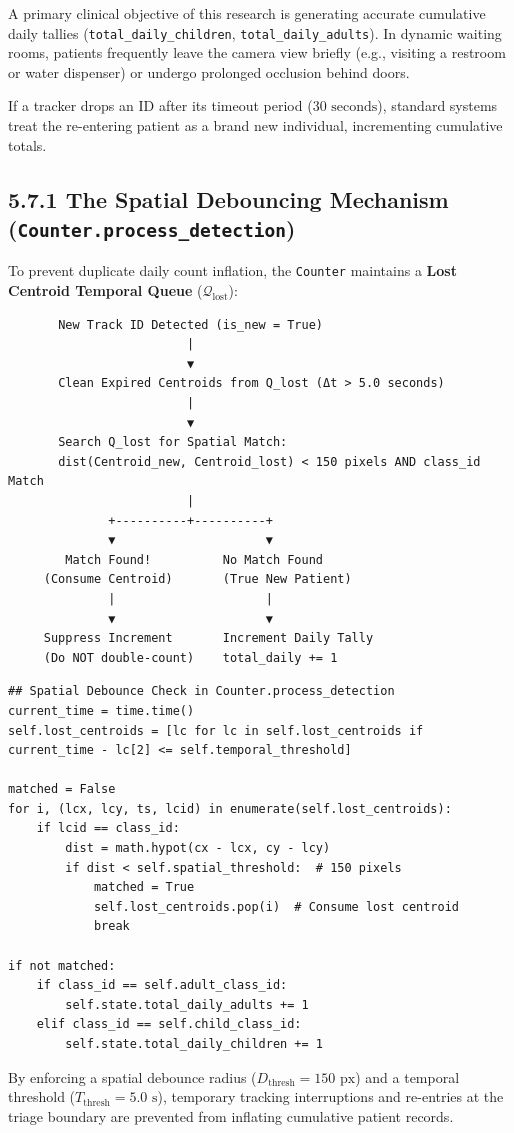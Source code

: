 A primary clinical objective of this research is generating accurate
cumulative daily tallies (\texttt{total\_daily\_children},
\texttt{total\_daily\_adults}). In dynamic waiting rooms, patients
frequently leave the camera view briefly (e.g., visiting a restroom or
water dispenser) or undergo prolonged occlusion behind doors.

If a tracker drops an ID after its timeout period
(\(30\text{ seconds}\)), standard systems treat the re-entering patient
as a brand new individual, incrementing cumulative totals.

\subsection{\texorpdfstring{5.7.1 The Spatial Debouncing Mechanism
(\texttt{Counter.process\_detection})}{5.7.1 The Spatial Debouncing Mechanism (Counter.process\_detection)}}\label{the-spatial-debouncing-mechanism-counter.process_detection}

To prevent duplicate daily count inflation, the \texttt{Counter}
maintains a \textbf{Lost Centroid Temporal Queue}
(\(\mathcal{Q}_{\text{lost}}\)):

\begin{verbatim}
       New Track ID Detected (is_new = True)
                         |
                         ▼
       Clean Expired Centroids from Q_lost (Δt > 5.0 seconds)
                         |
                         ▼
       Search Q_lost for Spatial Match:
       dist(Centroid_new, Centroid_lost) < 150 pixels AND class_id Match
                         |
              +----------+----------+
              ▼                     ▼
        Match Found!          No Match Found
     (Consume Centroid)       (True New Patient)
              |                     |
              ▼                     ▼
     Suppress Increment       Increment Daily Tally
     (Do NOT double-count)    total_daily += 1
\end{verbatim}

\begin{verbatim}
## Spatial Debounce Check in Counter.process_detection
current_time = time.time()
self.lost_centroids = [lc for lc in self.lost_centroids if current_time - lc[2] <= self.temporal_threshold]

matched = False
for i, (lcx, lcy, ts, lcid) in enumerate(self.lost_centroids):
    if lcid == class_id:
        dist = math.hypot(cx - lcx, cy - lcy)
        if dist < self.spatial_threshold:  # 150 pixels
            matched = True
            self.lost_centroids.pop(i)  # Consume lost centroid
            break

if not matched:
    if class_id == self.adult_class_id:
        self.state.total_daily_adults += 1
    elif class_id == self.child_class_id:
        self.state.total_daily_children += 1
\end{verbatim}

By enforcing a spatial debounce radius
(\(D_{\text{thresh}} = 150\text{ px}\)) and a temporal threshold
(\(T_{\text{thresh}} = 5.0\text{ s}\)), temporary tracking interruptions
and re-entries at the triage boundary are prevented from inflating
cumulative patient records.
